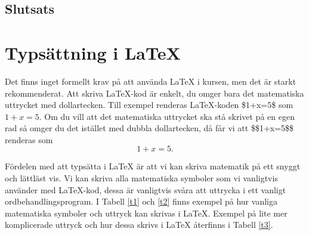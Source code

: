 \documentclass[titlepage]{article}
\begin{document}
\subsection{Slutsats}




\section{Typsättning i \LaTeX}

Det finns inget formellt krav på att använda \LaTeX$ $ i kursen, men det är starkt rekommenderat. Att skriva \LaTeX-kod är enkelt, du omger bara det matematiska uttrycket med dollartecken. Till exempel renderas \LaTeX-koden \$1+x=5\$ som $1+x=5$. Om du vill att det matematiska uttrycket ska stå skrivet på en egen rad så omger du det istället med dubbla dollartecken, då får vi att \$\$1+x=5\$\$ renderas som $$1+x=5.$$

Fördelen med att typsätta i \LaTeX$ $ är att vi kan skriva matematik på ett snyggt och lättläst vis. Vi kan skriva alla matematiska symboler som vi vanligtvis använder med \LaTeX-kod, dessa är vanligtvis svåra att uttrycka i ett vanligt ordbehandlingsprogram. I Tabell \ref{t1} och \ref{t2} finns exempel på hur vanliga matematiska symboler och uttryck kan skrivas i \LaTeX. Exempel på lite mer komplicerade uttryck och hur dessa skrivs i \LaTeX$ $ återfinns i Tabell \ref{t3}.
\end{document}
